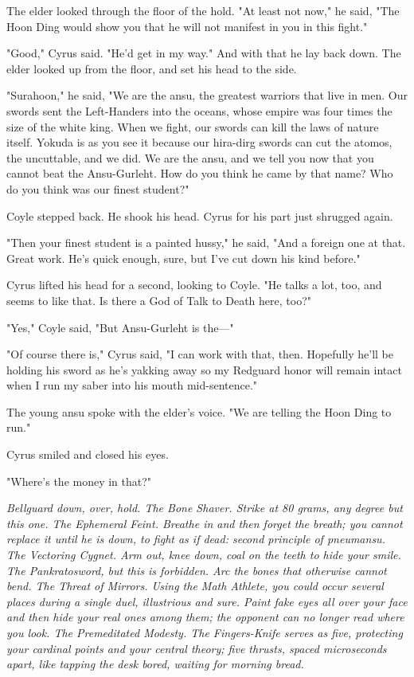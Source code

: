 The elder looked through the floor of the hold. "At least not now," he said, "The Hoon Ding would show you that he will not manifest in you in this fight."

"Good," Cyrus said. "He’d get in my way." And with that he lay back down. The elder looked up from the floor, and set his head to the side.

"Surahoon," he said, "We are the ansu, the greatest warriors that live in men. Our swords sent the Left-Handers into the oceans, whose empire was four times the size of the white king. When we fight, our swords can kill the laws of nature itself. Yokuda is as you see it because our hira-dirg swords can cut the atomos, the uncuttable, and we did. We are the ansu, and we tell you now that you cannot beat the Ansu-Gurleht. How do you think he came by that name? Who do you think was our finest student?"

Coyle stepped back. He shook his head. Cyrus for his part just shrugged again.

"Then your finest student is a painted hussy," he said, "And a foreign one at that. Great work. He’s quick enough, sure, but I’ve cut down his kind before."

Cyrus lifted his head for a second, looking to Coyle. "He talks a lot, too, and seems to like that. Is there a God of Talk to Death here, too?"

"Yes," Coyle said, "But Ansu-Gurleht is the—"

"Of course there is," Cyrus said, "I can work with that, then. Hopefully he’ll be holding his sword as he’s yakking away so my Redguard honor will remain intact when I run my saber into his mouth mid-sentence."

The young ansu spoke with the elder’s voice. "We are telling the Hoon Ding to run."

Cyrus smiled and closed his eyes.

"Where’s the money in that?"

\parabreak

\textit{Bellguard down, over, hold. The Bone Shaver. Strike at 80 grams, any degree but this one. The Ephemeral Feint. Breathe in and then forget the breath; you cannot replace it until he is down, to fight as if dead: second principle of pneumansu. The Vectoring Cygnet. Arm out, knee down, coal on the teeth to hide your smile. The Pankratosword, but this is forbidden. Arc the bones that otherwise cannot bend. The Threat of Mirrors. Using the Math Athlete, you could occur several places during a single duel, illustrious and sure. Paint fake eyes all over your face and then hide your real ones among them; the opponent can no longer read where you look. The Premeditated Modesty. The Fingers-Knife serves as five, protecting your cardinal points and your central theory; five thrusts, spaced microseconds apart, like tapping the desk bored, waiting for morning bread.}


